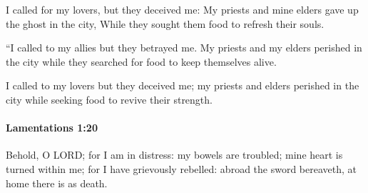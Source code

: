 			\begin{versebox}
					\item[BHS] 
					\item[LXX] 
					\item[ASV] I called for my lovers, but they deceived me: My priests and mine elders gave up the ghost in the city, While they sought them food to refresh their souls.
					\item[NIV] “I called to my allies but they betrayed me. My priests and my elders perished in the city while they searched for food to keep themselves alive.
					\item[NRSV] I called to my lovers but they deceived me; my priests and elders perished in the city while seeking food to revive their strength.
			\end{versebox}

		\paragraph{Lamentations 1:20} %
			\label{LAMENTATIONS-1-20}

			Behold, O LORD; for I am in distress: my bowels are troubled; mine heart is turned within me; for I have grievously rebelled: abroad the sword bereaveth, at home there is as death.

